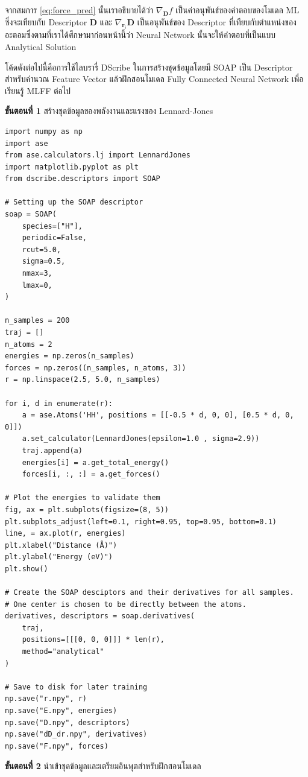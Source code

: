 \noindent จากสมการ \eqref{eq:force_pred} นั้นเราอธิบายได้ว่า $\nabla_{\bm{D}} f$ เป็นค่าอนุพันธ์ของคำตอบของโมเดล ML ซึ่งจะเทียบกับ Descriptor $\bm{D}$ และ $\nabla_{\bm{r}_{i}} \bm{D}$ เป็นอนุพันธ์ของ Descriptor ที่เทียบกับตำแหน่งของอะตอมซึ่งตามที่เราได้ศึกษามาก่อนหน้านี้ว่า Neural Network นั้นจะให้คำตอบที่เป็นแบบ Analytical Solution

โค้ดดังต่อไปนี้คือการใช้ไลบรารี่ DScribe ในการสร้างชุดข้อมูลโดยมี SOAP เป็น Descriptor สำหรับคำนวณ Feature Vector แล้วฝึกสอนโมเดล Fully Connected Neural Network เพื่อเรียนรู้ MLFF ต่อไป

\noindent \textbf{ขั้นตอนที่ 1} สร้างชุดข้อมูลของพลังงานและแรงของ Lennard-Jones

\begin{lstlisting}[style=MyPython]
import numpy as np
import ase
from ase.calculators.lj import LennardJones
import matplotlib.pyplot as plt
from dscribe.descriptors import SOAP

# Setting up the SOAP descriptor
soap = SOAP(
    species=["H"],
    periodic=False,
    rcut=5.0,
    sigma=0.5,
    nmax=3,
    lmax=0,
)

n_samples = 200
traj = []
n_atoms = 2
energies = np.zeros(n_samples)
forces = np.zeros((n_samples, n_atoms, 3))
r = np.linspace(2.5, 5.0, n_samples)

for i, d in enumerate(r):
    a = ase.Atoms('HH', positions = [[-0.5 * d, 0, 0], [0.5 * d, 0, 0]])
    a.set_calculator(LennardJones(epsilon=1.0 , sigma=2.9))
    traj.append(a)
    energies[i] = a.get_total_energy()
    forces[i, :, :] = a.get_forces()
	
# Plot the energies to validate them
fig, ax = plt.subplots(figsize=(8, 5))
plt.subplots_adjust(left=0.1, right=0.95, top=0.95, bottom=0.1)
line, = ax.plot(r, energies)
plt.xlabel("Distance (Å)")
plt.ylabel("Energy (eV)")
plt.show()

# Create the SOAP desciptors and their derivatives for all samples. 
# One center is chosen to be directly between the atoms.
derivatives, descriptors = soap.derivatives(
    traj,
    positions=[[[0, 0, 0]]] * len(r),
    method="analytical"
)

# Save to disk for later training
np.save("r.npy", r)
np.save("E.npy", energies)
np.save("D.npy", descriptors)
np.save("dD_dr.npy", derivatives)
np.save("F.npy", forces)
\end{lstlisting}

\vspace{1em}

\noindent \textbf{ขั้นตอนที่ 2} นำเข้าชุดข้อมูลและเตรียมอินพุตสำหรับฝึกสอนโมเดล

